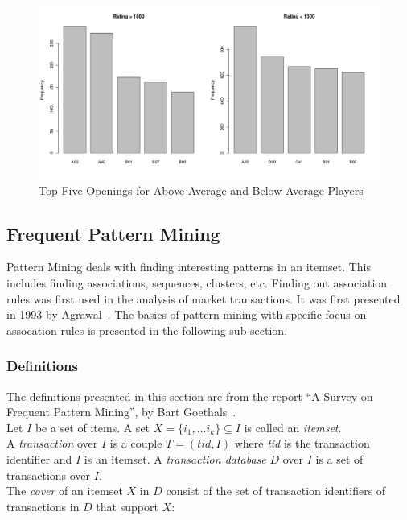 \documentclass{article}
\begin{document}
\begin{figure} [htp]
\begin{center}
\includegraphics[width=5in]{eco_bar_comp.png}
\end{center}
\caption{Top Five Openings for Above Average and Below Average Players}
\label{fig:ecobarcomp}
\end{figure}


\subsection{Frequent Pattern Mining}
Pattern Mining deals with finding interesting patterns in an itemset. This includes finding associations, sequences, clusters, etc. Finding out association rules was first used in the analysis of market transactions. It was first presented in 1993 by Agrawal~\cite{paper:agrawal}. The basics of pattern mining with specific focus on assocation rules is presented in the following sub-section.


\subsubsection{Definitions}
The definitions presented in this section are from the report ``A Survey on Frequent Pattern Mining'', by Bart Goethals~\cite{report:patternmining}.\\

Let $I$ be a set of items. A set $X = \{i_1, ... i_k\} \subseteq I$ is called an {\sl itemset}. \\

A {\sl transaction} over $I$ is a couple $T = (tid, I)$ where {\sl tid} is the transaction identifier and $I$ is an itemset. A {\sl transaction database} $D$ over $I$ is a set of transactions over $I$. \\

The {\sl cover} of an itemset $X$ in $D$ consist of the set of transaction identifiers of transactions in $D$ that support $X$:
\end{document}
